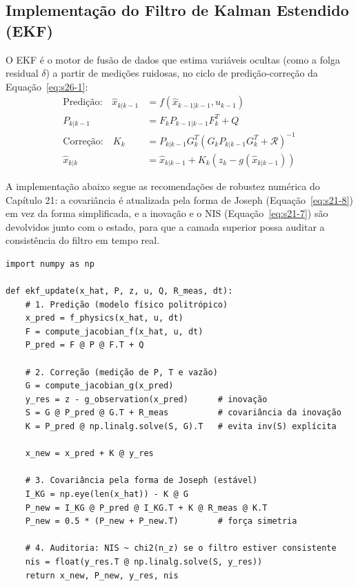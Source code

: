 \documentclass[12pt,a4paper]{article}
\numberwithin{equation}{section}
\numberwithin{table}{section}
\numberwithin{figure}{section}
\begin{document}
	\subsection{Implementação do Filtro de Kalman Estendido (EKF)}
	O EKF é o motor de fusão de dados que estima variáveis ocultas (como a folga residual $\delta$) a partir de medições ruidosas, no ciclo de predição-correção da Equação~\eqref{eq:s26-1}:
	\begin{equation}\label{eq:s26-1}
	\begin{aligned}
		\text{Predição:} \quad \hat{x}_{k|k-1} &= f(\hat{x}_{k-1|k-1}, u_{k-1}) \\[4pt]
		P_{k|k-1} &= F_k P_{k-1|k-1} F_k^T + Q \\[8pt]
		\text{Correção:} \quad K_k &= P_{k|k-1} G_k^T (G_k P_{k|k-1} G_k^T + \mathcal{R})^{-1} \\[4pt]
		\hat{x}_{k|k} &= \hat{x}_{k|k-1} + K_k (z_k - g(\hat{x}_{k|k-1}))
	\end{aligned}
\end{equation}
	
	A implementação abaixo segue as recomendações de robustez numérica do Capítulo 21: a covariância é atualizada pela forma de Joseph (Equação~\eqref{eq:s21-8}) em vez da forma simplificada, e a inovação e o NIS (Equação~\eqref{eq:s21-7}) são devolvidos junto com o estado, para que a camada superior possa auditar a consistência do filtro em tempo real.

	\begin{verbatim}
import numpy as np

def ekf_update(x_hat, P, z, u, Q, R_meas, dt):
    # 1. Predição (modelo físico politrópico)
    x_pred = f_physics(x_hat, u, dt)
    F = compute_jacobian_f(x_hat, u, dt)
    P_pred = F @ P @ F.T + Q

    # 2. Correção (medição de P, T e vazão)
    G = compute_jacobian_g(x_pred)
    y_res = z - g_observation(x_pred)      # inovação
    S = G @ P_pred @ G.T + R_meas          # covariância da inovação
    K = P_pred @ np.linalg.solve(S, G).T   # evita inv(S) explícita

    x_new = x_pred + K @ y_res

    # 3. Covariância pela forma de Joseph (estável)
    I_KG = np.eye(len(x_hat)) - K @ G
    P_new = I_KG @ P_pred @ I_KG.T + K @ R_meas @ K.T
    P_new = 0.5 * (P_new + P_new.T)        # força simetria

    # 4. Auditoria: NIS ~ chi2(n_z) se o filtro estiver consistente
    nis = float(y_res.T @ np.linalg.solve(S, y_res))
    return x_new, P_new, y_res, nis
\end{verbatim}
\end{document}
